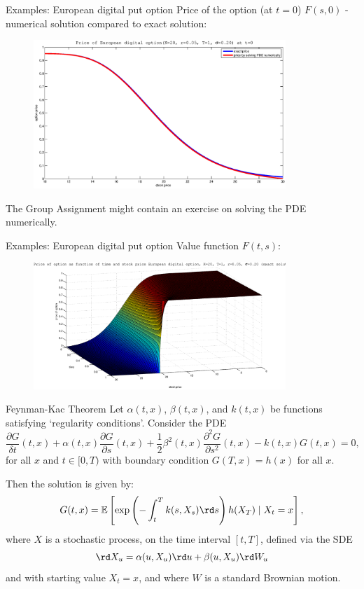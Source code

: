 \documentclass[pdf, handout]{beamer}
\begin{document}
\begin{frame}{Examples: European digital put option}
Price of the option (at $t=0$) $F(s,0)$ - numerical solution compared to exact solution:
\begin{figure}
\includegraphics[width=0.85\textwidth]{startprice_dig_put.eps}
\end{figure}
The Group Assignment might contain an exercise on solving the PDE numerically.
\end{frame}

\begin{frame}{Examples: European digital put option}
Value function $F(t,s)$:
\begin{figure}
\includegraphics[width=0.85\textwidth]{value_dig_put.eps}
\end{figure}
\end{frame}

\begin{frame}{Feynman-Kac Theorem}
Let $\alpha(t, x)$, $\beta(t,x)$, and $k(t,x)$ be  functions satisfying `regularity conditions'.
Consider the PDE
\[
\frac{\partial G}{\delta t}(t, x) +  \alpha(t, x) \frac{\partial G}{\partial
s}(t, x) + \frac{1}{2} \beta^2(t,x)  \frac{\partial^2 G}{\partial
s^2}(t,x) - k(t, x)  G(t,x )=0, 
\]
for all $x$ and 
$t\in[0, T)$ with boundary condition $G(T, x) = h(x)$ for all $x$.  

Then the solution is given by:
\[
G(t,x)= \mathbb{E}\left[ 
 \exp\left( -  \int_t^T k(s, X_s) \rd s  \right) h( X_T)
\mid X_t=x
\right],
\]
where $X$ is a stochastic process, on the time interval $[t, T]$, defined via the SDE
\[
\rd X_u = \alpha(u,X_u) \rd u + \beta(u, X_u) \rd W_u
\]
and with starting value $X_t=x$, and
where $W$ is a standard Brownian motion.
\end{frame}
\end{document}
